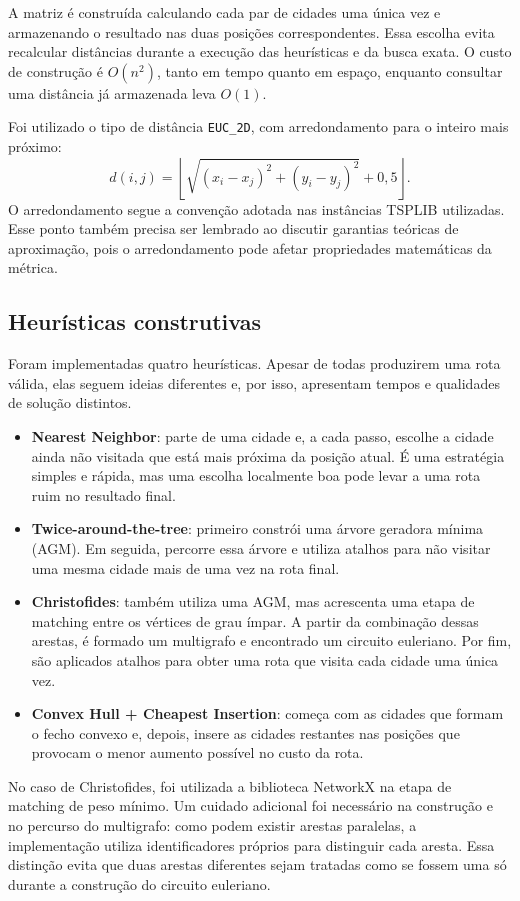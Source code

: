\documentclass[12pt]{article}
\begin{document}
A matriz é construída calculando cada par de cidades uma única vez e armazenando o resultado nas duas posições correspondentes. Essa escolha evita recalcular distâncias durante a execução das heurísticas e da busca exata. O custo de construção é $O(n^2)$, tanto em tempo quanto em espaço, enquanto consultar uma distância já armazenada leva $O(1)$.

Foi utilizado o tipo de distância \texttt{EUC\_2D}, com arredondamento para o inteiro mais próximo:
\[
d(i,j)=\left\lfloor \sqrt{(x_i-x_j)^2+(y_i-y_j)^2}+0{,}5\right\rfloor.
\]
O arredondamento segue a convenção adotada nas instâncias TSPLIB utilizadas. Esse ponto também precisa ser lembrado ao discutir garantias teóricas de aproximação, pois o arredondamento pode afetar propriedades matemáticas da métrica.

\subsection{Heurísticas construtivas}

Foram implementadas quatro heurísticas. Apesar de todas produzirem uma rota válida, elas seguem ideias diferentes e, por isso, apresentam tempos e qualidades de solução distintos.

\begin{itemize}
\item \textbf{Nearest Neighbor}: parte de uma cidade e, a cada passo, escolhe a cidade ainda não visitada que está mais próxima da posição atual. É uma estratégia simples e rápida, mas uma escolha localmente boa pode levar a uma rota ruim no resultado final.
\item \textbf{Twice-around-the-tree}: primeiro constrói uma árvore geradora mínima (AGM). Em seguida, percorre essa árvore e utiliza atalhos para não visitar uma mesma cidade mais de uma vez na rota final.
\item \textbf{Christofides}: também utiliza uma AGM, mas acrescenta uma etapa de matching entre os vértices de grau ímpar. A partir da combinação dessas arestas, é formado um multigrafo e encontrado um circuito euleriano. Por fim, são aplicados atalhos para obter uma rota que visita cada cidade uma única vez.
\item \textbf{Convex Hull + Cheapest Insertion}: começa com as cidades que formam o fecho convexo e, depois, insere as cidades restantes nas posições que provocam o menor aumento possível no custo da rota.
\end{itemize}

No caso de Christofides, foi utilizada a biblioteca NetworkX na etapa de matching de peso mínimo. Um cuidado adicional foi necessário na construção e no percurso do multigrafo: como podem existir arestas paralelas, a implementação utiliza identificadores próprios para distinguir cada aresta. Essa distinção evita que duas arestas diferentes sejam tratadas como se fossem uma só durante a construção do circuito euleriano.
\end{document}
